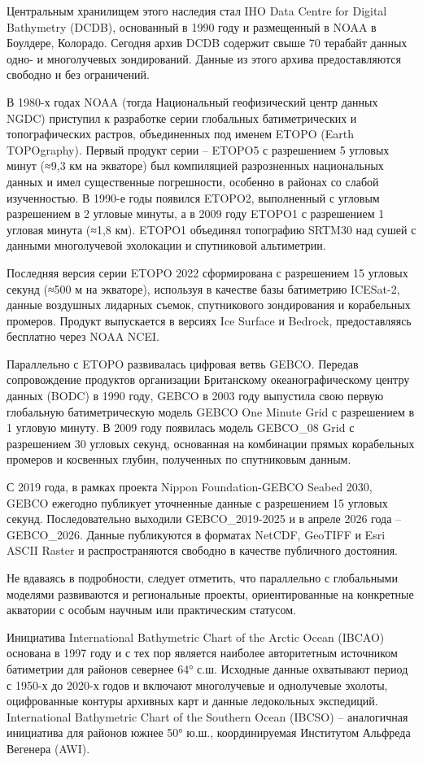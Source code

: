 Центральным хранилищем этого наследия стал IHO Data Centre for Digital Bathymetry (DCDB), основанный в 1990 году и размещенный в NOAA в Боулдере, Колорадо. 
Сегодня архив DCDB содержит свыше 70 терабайт данных одно- и многолучевых зондирований. Данные из этого архива предоставляются свободно и без ограничений.

В 1980-х годах NOAA (тогда Национальный геофизический центр данных NGDC) приступил к разработке серии глобальных батиметрических и топографических растров, объединенных под именем ETOPO (Earth TOPOgraphy). 
Первый продукт серии -- ETOPO5 с разрешением 5 угловых минут (≈9,3 км на экваторе) был компиляцией разрозненных национальных данных и имел существенные погрешности, особенно в районах со слабой изученностью.
В 1990-е годы появился ETOPO2, выполненный с угловым разрешением в 2 угловые минуты, а в 2009 году ETOPO1 с разрешением 1 угловая минута (≈1,8 км). 
ETOPO1 объединял топографию SRTM30 над сушей с данными многолучевой эхолокации и спутниковой альтиметрии.

Последняя версия серии ETOPO 2022 сформирована с разрешением 15 угловых секунд (≈500 м на экваторе), используя в качестве базы батиметрию ICESat-2, данные воздушных лидарных съемок, спутникового зондирования и корабельных промеров. 
Продукт выпускается в версиях  Ice Surface и Bedrock, предоставляясь бесплатно через NOAA NCEI.

Параллельно с ETOPO развивалась цифровая ветвь GEBCO. 
Передав сопровождение продуктов организации Британскому океанографическому центру данных (BODC) в 1990 году, GEBCO в 2003 году выпустила свою первую глобальную батиметрическую модель GEBCO One Minute Grid с разрешением в 1 угловую минуту. 
В 2009 году появилась модель GEBCO\_08 Grid с разрешением 30 угловых секунд, основанная на комбинации прямых корабельных промеров и косвенных глубин, полученных по спутниковым данным.

С 2019 года, в рамках проекта Nippon Foundation-GEBCO Seabed 2030, GEBCO ежегодно публикует уточненные данные с разрешением 15 угловых секунд. 
Последовательно выходили GEBCO\_2019-2025 и в апреле 2026 года -- GEBCO\_2026. 
Данные публикуются в форматах NetCDF, GeoTIFF и Esri ASCII Raster и распространяются свободно в качестве публичного достояния.

Не вдаваясь в подробности, следует отметить, что параллельно с глобальными моделями развиваются и региональные проекты, ориентированные на конкретные акватории с особым научным или практическим статусом.

Инициатива International Bathymetric Chart of the Arctic Ocean (IBCAO) основана в 1997 году и с тех пор является наиболее авторитетным источником батиметрии для районов севернее 64° с.ш.
Исходные данные охватывают период с 1950-х до 2020-х годов и включают многолучевые и однолучевые эхолоты, оцифрованные контуры архивных карт и данные ледокольных экспедиций. 
International Bathymetric Chart of the Southern Ocean (IBCSO) -- аналогичная инициатива для районов южнее 50° ю.ш., координируемая Институтом Альфреда Вегенера (AWI).

